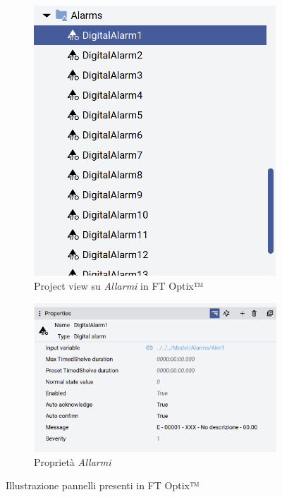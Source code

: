 \begin{figure}[h!]
    \centering
    \begin{subfigure}[t]{0.35\textwidth} %
        \includegraphics[width=\linewidth]{Immagini/CartellaAllarmi.png}
        \caption{Project view su \textit{Allarmi} in FT Optix™}
        \label{fig:CartellaAllarmi.png}
    \end{subfigure}
    \hfill
    \begin{subfigure}[t]{0.55\textwidth} %
        \centering
        \includegraphics[width=\linewidth]{Immagini/AllarmiInfografica.png}
        \caption{Proprietà \textit{Allarmi}}
        \label{fig:AllarmiInfografica.png}
    \end{subfigure}
    \caption{Illustrazione pannelli presenti in FT Optix™}
    \label{fig:two-images00}
\end{figure}

